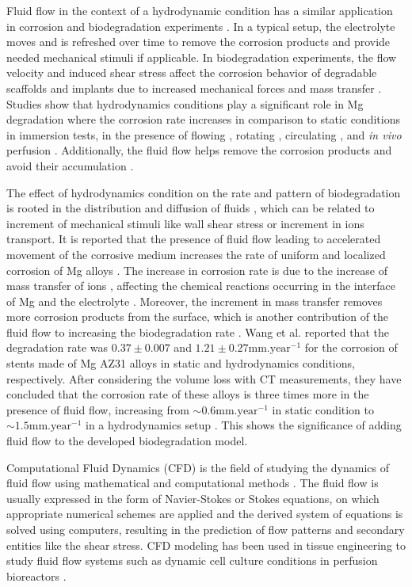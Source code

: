 Fluid flow in the context of a hydrodynamic condition has a similar application in corrosion and biodegradation experiments \cite{Wang2014}. In a typical setup, the electrolyte moves and is refreshed over time to remove the corrosion products and provide needed mechanical stimuli if applicable. In biodegradation experiments, the flow velocity and induced shear stress affect the corrosion behavior of degradable scaffolds and implants due to increased mechanical forces and mass transfer \cite{Wang2014}. Studies show that hydrodynamics conditions play a significant role in Mg degradation \cite{Levesque2008} where the corrosion rate increases in comparison to static conditions in immersion tests, in the presence of flowing \cite{Li2012}, rotating \cite{Jafarzadeh2009}, circulating \cite{Chen2010}, and \textit{in vivo} perfusion \cite{Witte2013}. Additionally, the fluid flow helps remove the corrosion products and avoid their accumulation \cite{Hiromoto2008}.

The effect of hydrodynamics condition on the rate and pattern of biodegradation is rooted in the distribution and diffusion of fluids \cite{Efird2011}, which can be related to increment of mechanical stimuli like wall shear stress or increment in ions transport. It is reported that the presence of fluid flow leading to accelerated movement of the corrosive medium increases the rate of uniform and localized corrosion of Mg alloys \cite{Wang2014}. The increase in corrosion rate is due to the increase of mass transfer of ions \cite{Efird2011}, affecting the chemical reactions occurring in the interface of Mg and the electrolyte \cite{Hiromoto2008,Xu2009}. Moreover, the increment in mass transfer removes more corrosion products from the surface, which is another contribution of the fluid flow to increasing the biodegradation rate \cite{Efird2011}. Wang et al. \cite{Wang2014} reported that the degradation rate was $0.37\pm0.007$ and $1.21\pm0.27 \text{mm.year}^{-1}$ for the corrosion of stents made of Mg AZ31 alloys in static and hydrodynamics conditions, respectively. After considering the volume loss with {CT} measurements, they have concluded that the corrosion rate of these alloys is three times more in the presence of fluid flow, increasing from $\sim 0.6\text{mm.year}^{-1}$ in static condition to $\sim 1.5\text{mm.year}^{-1}$ in a hydrodynamics setup \cite{Wang2014}. This shows the significance of adding fluid flow to the developed biodegradation model.

Computational Fluid Dynamics ({CFD}) is the field of studying the dynamics of fluid flow using mathematical and computational methods \cite{H.Versteeg2007,Sharma2022}. The fluid flow is usually expressed in the form of Navier-Stokes or Stokes equations, on which appropriate numerical schemes are applied and the derived system of equations is solved using computers, resulting in the prediction of flow patterns and secondary entities like the shear stress. {CFD} modeling has been used in tissue engineering to study fluid flow systems such as dynamic cell culture conditions in perfusion bioreactors \cite{Hutmacher2008, Hossain2012,Patrachari2012}.

